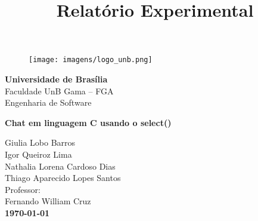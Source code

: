\documentclass[a4paper]{article}
\begin{document}
\title{Relatório Experimental}

\begin{titlepage}
	\begin{center}
		\begin{figure}[htb!]
			\begin{flushleft}
				\texttt{[image: imagens/logo\_unb.png]}
			\end{flushleft}
		\end{figure}
        \vspace{-2.5cm}
        \hspace{2.1cm}\Large{\textbf{Universidade de Brasília}}\\
        \hspace{2.1cm}\Large{Faculdade UnB Gama – FGA}\\
        \hspace{2.1cm}\Large{Engenharia de Software}\\
        
        \vspace{200pt}
        
        \LARGE{\textbf{Chat em linguagem C usando o select()}}\\ 
        
        \vspace{160pt}
            
        \vspace{30pt} 
        \hfill Giulia Lobo Barros \hspace{20pt} \\
        \hfill Igor Queiroz Lima  \hspace{20pt} \\
        \hfill Nathalia Lorena Cardoso Dias \hspace{20pt}\\
        \hfill Thiago Aparecido Lopes Santos \hspace{20pt}\\

        \vspace{25pt}
        \hfill {Professor:}\\
        \hfill Fernando William Cruz\\
        
        
        \vspace{\fill}
        \LARGE \bf{\today}
          
	\end{center}
\end{titlepage}
\end{document}
